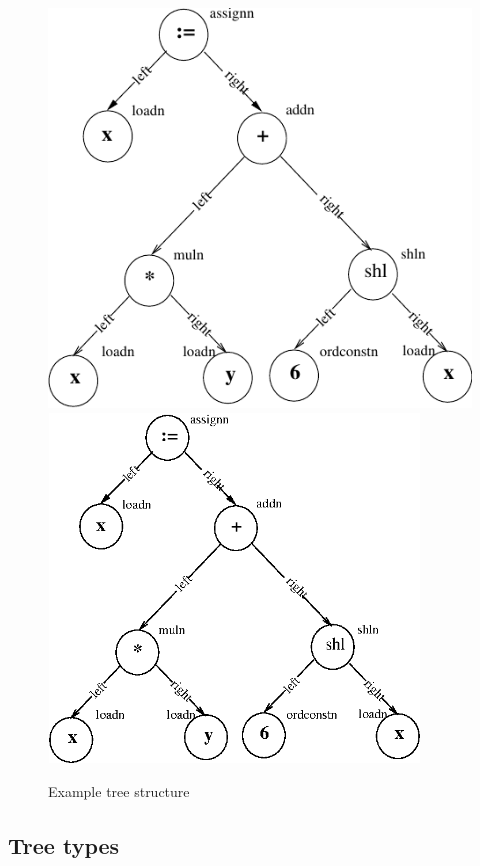 \documentclass [a4paper,12pt]{article}
\begin{document}
\begin{figure}
\begin{center}
\ifpdf
\includegraphics{arch3.pdf}
\else
\includegraphics[width=3.88in,height=3.65in]{arch3.eps}
\fi
\caption{Example tree structure}
\label{fig3}
\end{center}
\end{figure}

\subsection{Tree types}
\end{document}
